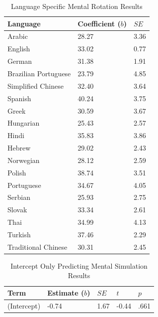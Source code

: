\documentclass[
  man,mask,floatsintext]{apa7}
\begin{document}
\begin{table}[tbp]

\begin{center}
\begin{threeparttable}

\caption{\label{tab:random_e}Language Specific Mental Rotation Results}

\begin{tabular}{lll}
\toprule
Language & Coefficient ($b$) & $SE$\\
\midrule
Arabic & 28.27 & 3.36\\
English & 33.02 & 0.77\\
German & 31.38 & 1.91\\
Brazilian Portuguese & 23.79 & 4.85\\
Simplified Chinese & 32.40 & 3.64\\
Spanish & 40.24 & 3.75\\
Greek & 30.59 & 3.67\\
Hungarian & 25.43 & 2.57\\
Hindi & 35.83 & 3.86\\
Hebrew & 29.02 & 2.43\\
Norwegian & 28.12 & 2.59\\
Polish & 38.74 & 3.51\\
Portuguese & 34.67 & 4.05\\
Serbian & 25.93 & 2.75\\
Slovak & 33.34 & 2.61\\
Thai & 34.99 & 4.13\\
Turkish & 37.46 & 2.29\\
Traditional Chinese & 30.31 & 2.45\\
\bottomrule
\end{tabular}

\end{threeparttable}
\end{center}

\end{table}

\begin{table}[tbp]

\begin{center}
\begin{threeparttable}

\caption{\label{tab:pred_intercept}Intercept Only Predicting Mental Simulation Results}

\begin{tabular}{lllll}
\toprule
Term & Estimate ($b$) & $SE$ & $t$ & $p$\\
\midrule
(Intercept) & -0.74 & 1.67 & -0.44 & .661\\
\bottomrule
\end{tabular}

\end{threeparttable}
\end{center}

\end{table}
\end{document}
